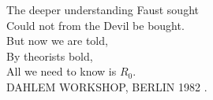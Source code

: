 \documentclass[11pt,a4paper]{report}      %
\begin{document}
\thesiscopyrightpage                 %

\thesistitlecolourpage           %


\newpage

\vspace*{\fill}

\raggedright\Large{
\hspace{3cm} The deeper understanding Faust sought\\
\hspace{3cm} Could not from the Devil be bought.\\
\hspace{3cm} But now we are told,\\
\hspace{3cm} By theorists bold,\\
\hspace{3cm} All we need to know is $R_0$.\\}
\vspace{0.8cm}
\raggedleft\normalsize\MakeUppercase{Dahlem Workshop, Berlin 1982} \cite{Anderson1982_workshop}.

\vspace*{\fill}
\raggedright

\tableofcontents    %
\listoftables      %
\listoffigures     %

\clearpage\begingroup\let\newpage\relax\printnoidxglossary[type=\acronymtype]
\endgroup
\clearpage\begingroup\let\newpage\relax\printnoidxglossary
\endgroup
\end{document}
